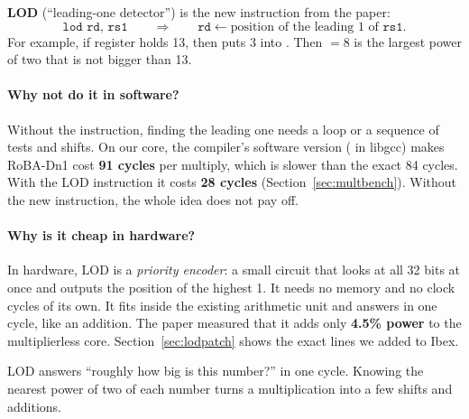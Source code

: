 \textbf{LOD} (``leading-one detector'') is the new instruction from the paper:
\[
  \texttt{lod rd, rs1}\qquad\Longrightarrow\qquad \texttt{rd} \gets \text{position of the leading 1 of } \texttt{rs1}.
\]
For example, if register  holds 13, then  puts 3 into .
Then  $=8$ is the largest power of two that is not bigger than 13.

\paragraph{Why not do it in software?} Without the instruction, finding the leading one needs a
loop or a sequence of tests and shifts. On our core, the compiler's software version
( in libgcc) makes RoBA-Dn1 cost \textbf{91 cycles} per multiply, which is slower
than the exact 84 cycles. With the LOD instruction it costs \textbf{28 cycles}
(Section~\ref{sec:multbench}). Without the new instruction, the whole idea does not pay off.

\paragraph{Why is it cheap in hardware?} In hardware, LOD is a \emph{priority encoder}: a small
circuit that looks at all 32 bits at once and outputs the position of the highest 1. It needs no
memory and no clock cycles of its own. It fits inside the existing arithmetic unit and answers in one
cycle, like an addition. The paper measured that it adds only \textbf{4.5\% power} to the
multiplierless core. Section~\ref{sec:lodpatch} shows the exact lines we added to Ibex.

\begin{keyidea}
LOD answers ``roughly how big is this number?'' in one cycle. Knowing the nearest power of two
of each number turns a multiplication into a few shifts and additions.
\end{keyidea}
\newpage
